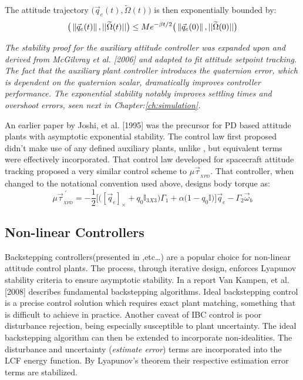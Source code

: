 {The attitude trajectory $\big(\vec{q}_e(t),\widetilde{\Omega}(t)\big)$ is then exponentially bounded by:
\begin{equation}
\big(\left\lVert\vec{q}_e(t)\right\rVert,||\widetilde{\Omega}(t)||\big)\leq Me^{-\beta t/2}\big(\left\lVert\vec{q}_e(0)\right\rVert,||\widetilde{\Omega}(0)||\big)
\end{equation}
\par
\emph{\color{Gray}The stability proof for the auxiliary attitude controller was expanded upon and derived from McGilvray et al. [2006]\cite{attitudestabilization} and adapted to fit attitude setpoint tracking. The fact that the auxiliary plant controller introduces the quaternion error, which is dependent on the quaternion scalar, dramatically improves controller performance. The exponential stability notably improves settling times and overshoot errors, seen next in Chapter:\ref{ch:simulation}.}
\par
An earlier paper by Joshi, et al. [1995]\cite{robustattitude} was the precursor for PD based attitude plants with asymptotic exponential stability. The control law first proposed didn't make use of any defined auxiliary plants, unlike \cite{attitudestabilization}, but equivalent terms were effectively incorporated. That control law developed for spacecraft attitude tracking proposed a very similar control scheme to $\mu\vec{\tau}_{_{XPD}}$. That controller, when changed to the notational convention used above, designs body torque as:
\begin{equation}
\mu\vec{\tau}^{\hspace{3pt}'}_{_{XPD}}=-\frac{1}{2}\Big[\big([\vec{q}_e]_\times+q_0\mathbb{I}_{3X3}\big)\Gamma_1+\alpha\big(1-q_0\mathbb{I}\big)\Big]\vec{q}_e-\Gamma_2\vec{\omega}_b
\end{equation} 
\subsection{Non-linear Controllers}
\label{subsec:control.attitude.nonlinear}
Backstepping controllers(presented in \cite{satellitebackstepping,intelligentbackstep,backstepslidingmode},etc\ldots) are a popular choice for non-linear attitude control plants. The process, through iterative design, enforces Lyapunov stability criteria to ensure asymptotic stability. In a report \cite{backstepping} Van Kampen, et al. [2008] describes fundamental backstepping algorithms. Ideal backstepping control is a precise control solution which requires exact plant matching, something that is difficult to achieve in practice. Another caveat of IBC control is poor disturbance rejection, being especially susceptible to plant uncertainty. The ideal backstepping algorithm can then be extended to incorporate non-idealities. The disturbance and uncertainty (\emph{estimate error}) terms are incorporated into the LCF energy function. By Lyapunov's theorem their respective estimation error terms are stabilized.
}
